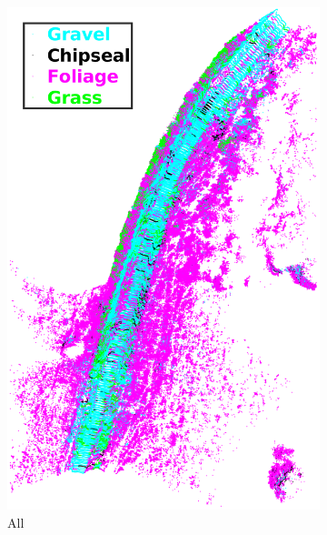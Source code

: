 \documentclass[numbered,pdftex]{ohio-etd}
\begin{document}
{		\begin{figure}[H]
			\centering
			\begin{subfigure}{0.49\textwidth}
				\centering
				\includegraphics[width = \textwidth]{Defense_Images/sturbois_curve_1_all_classified.png}
				\caption{All}
				\label{fig:Classified_PointCloud_1_ALL}
			\end{subfigure}
			\begin{subfigure}{0.49\textwidth}
				\centering

\end{subfigure}
\end{figure}}
\end{document}
